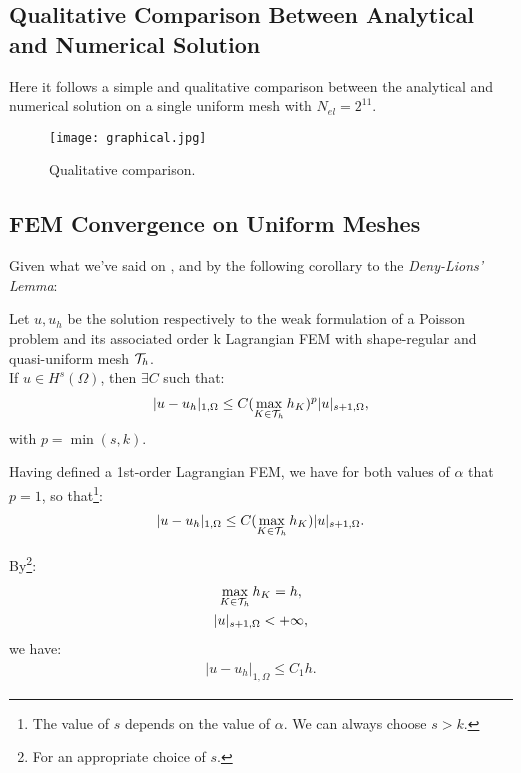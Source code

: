 \subsection{Qualitative Comparison Between Analytical and Numerical Solution}

Here it follows a simple and qualitative comparison between the analytical and numerical solution on a single uniform mesh with $N_{el} = 2^{11}$.

\begin{figure}[!ht]
	\centering
	\texttt{[image: graphical.jpg]}
	\caption{Qualitative comparison.}
\end{figure}

\subsection{FEM Convergence on Uniform Meshes}

Given what we've said on , and by the following corollary to the \textit{Deny-Lions' Lemma}:

\begin{theorem}
	Let $u, u_h$ be the solution respectively to the weak formulation of a Poisson problem and its associated order k Lagrangian FEM with shape-regular and quasi-uniform mesh $\mathcal{T}_h$. \\ 
	If $u \in H^s(\Omega)$, then $\exists C$ such that:
	\begin{gather}
		|u - u_h|_{1, \Omega} \le C (\max_{K \in \mathcal{T}_h} h_K)^{p}|u|_{s+1, \Omega},
	\end{gather}
	with $p = \min(s, k)$.
\end{theorem}

Having defined a 1st-order Lagrangian FEM, we have for both values of $\alpha$ that $p = 1$, so that\footnote{The value of $s$ depends on the value of $\alpha$. We can always choose $s > k$.}:
\begin{gather}
	|u - u_h|_{1, \Omega} \le C (\max_{K \in \mathcal{T}_h} h_K)|u|_{s+1, \Omega}.
\end{gather}

By\footnote{For an appropriate choice of $s$.}:
\begin{gather}
	\max_{K \in \mathcal{T}_h} h_K = h, \\
	|u|_{s+1, \Omega} < +\infty,
\end{gather}
we have:
\begin{gather}
	|u - u_h|_{1, \Omega} \le C_1 h.
\end{gather}

